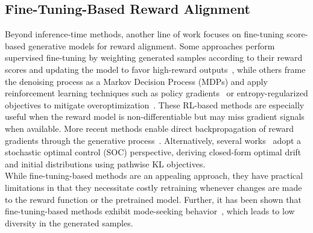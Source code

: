 \subsection{Fine-Tuning-Based Reward Alignment}
Beyond inference-time methods, another line of work focuses on fine-tuning score-based generative models for reward alignment. Some approaches perform supervised fine-tuning by weighting generated samples according to their reward scores and updating the model to favor high-reward outputs~\cite{lee2023aligning, wu2023hps}, while others frame the denoising process as a Markov Decision Process (MDPs) and apply reinforcement learning techniques such as policy gradients~\cite{black2024ddpo} or entropy-regularized objectives to mitigate overoptimization~\cite{fan2023reinforcement, Wallace_2024_DPO, yang2-24D3po}. These RL-based methods are especially useful when the reward model is non-differentiable but may miss gradient signals when available. More recent methods enable direct backpropagation of reward gradients through the generative process~\cite{clark2024draft, prabhudesai2024alignprop}. Alternatively, several works~\cite{uehara2024finetuningcontinuoustimediffusionmodels, tang2024finetuningdiffusionmodelsstochastic, domingo-enrich2025adjoint} adopt a stochastic optimal control (SOC) perspective, deriving closed-form optimal drift and initial distributions using pathwise KL objectives. \\
While fine-tuning-based methods are an appealing approach, they have practical limitations in that they necessitate costly retraining whenever changes are made to the reward function or the pretrained model. Further, it has been shown that fine-tuning-based methods exhibit mode-seeking behavior~\cite{kim2025DAS}, which leads to low diversity in the generated samples.
